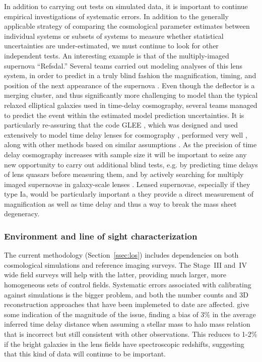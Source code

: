 In addition to carrying out tests on simulated data, it is important
to continue empirical investigations of systematic errors. In addition
to the generally applicable strategy of comparing the cosmological
parameter estimates between individual systems or subsets of systems
to measure whether statistical uncertainties are under-estimated, we
must continue to look for other independent tests. An interesting
example is that of the multiply-imaged supernova ``Refsdal.'' Several
teams carried out modeling analyses of this lens system, in order to
predict in a truly blind fashion the magnification, timing, and
position of the next appearance of the supernova
\citep{Kel++15,Ogu15,S+J15,Jau++16,Tre++16,Kaw++16,Gri++16,Die++16}. Even
though the deflector is a merging cluster, and thus significantly more
challenging to model than the typical relaxed elliptical galaxies used
in time-delay cosmography, several teams managed to predict the event
\citep{Tre++16,Kel++16} within the estimated model prediction uncertainties.
It is particularly re-assuring that the code {\sc GLEE} \citep{S+H10},
which was designed and used extensively to model time delay lenses for
cosmography \citep{Suy++10,Suy++13,Suy++14}, performed very well
\citep{Gri++16,Kel++16}, along with other methods based on similar assumptions \citep{Kaw++16}. As the precision of time delay cosmography increases
with sample size it will be important to seize any new opportunity to
carry out additional blind tests, e.g. by predicting time delays of
lens quasars before measuring them, and by actively searching for
multiply imaged supernovae in galaxy-scale lenses
\citep{O+M10,Qui++14}. Lensed supernovae, especially if they type Ia,
would be particularly important a they provide a direct measurement of
magnification \citep{Pat+14,Nor+14,Rod++15} as well as time delay and thus a way to break the mass
sheet degeneracy.



\subsubsection{Environment and line of sight characterization}

The current methodology (Section~\ref{ssec:los}) includes dependencies
on both cosmological simulations and reference imaging surveys. The
Stage~III and~IV wide field surveys will help with the latter,
providing much larger, more homogeneous sets of control fields.
Systematic errors associated with calibrating against simulations is
the bigger problem, and both the number counts and 3D reconstruction
approaches that have been implemeted to date are affected.
\citet{CollettEtal2013} give some indication of the magnitude of the
issue, finding a bias of 3\% in the average inferred time delay distance
when assuming a stellar mass to halo mass relation that is incorrect
but still consistent with other observations. This reduces to 1-2\%
if the bright galaxies in the lens fields have spectroscopic redshifts,
suggesting that this kind of data will continue to be important.


